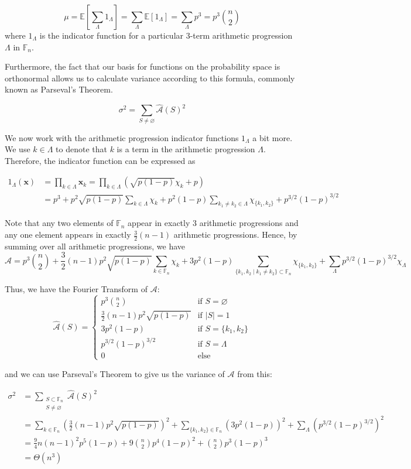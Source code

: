 \documentclass[12pt]{article} %
\newcommand{\p}[1]{\left(#1\right)}
\newcommand{\s}[1]{\left[#1\right]}
\newcommand{\abs}[1]{\left\lvert#1\right\rvert}
\newcommand{\ap}{\mathcal{A}}
\newcommand{\E}{\mathbb{E}}
\newcommand{\F}{\mathbb{F}}
\newcommand{\bfx}{\mathbf{x}}
\theoremstyle{definition}
\theoremstyle{remark}
\begin{document}
\[\mu = \E\s{\sum_{\Lambda} {1_\Lambda}} = \sum_{\Lambda} {\E[1_\Lambda]} = \sum_{\Lambda} {p^3} = p^3\binom{n}{2}\]
where $1_\Lambda$ is the indicator function for a particular 3-term arithmetic progression $\Lambda$ in $\F_n$.

Furthermore, the fact that our basis for functions on the probability space is orthonormal allows us to calculate variance according to this formula, commonly known as Parseval's Theorem.

\[\sigma^2 = \sum_{S \neq \varnothing} {\hat{\ap}(S)^2} \]

We now work with the arithmetic progression indicator functions $1_\Lambda$ a bit more. We use $k \in \Lambda$ to denote that $k$ is a term in the arithmetic progression $\Lambda$. Therefore, the indicator function can be expressed as

\begin{align*}
1_\Lambda(\bfx) &= \prod_{k \in \Lambda} {\bfx_k} = \prod_{k \in \Lambda} {\p{\sqrt{p(1-p)}\chi_k + p}} \\ 
&= p^3+p^2\sqrt{p(1-p)}\sum_{k \in \Lambda} {\chi_k} + p^2(1-p)\sum_{k_1 \neq k_2 \in \Lambda} {\chi_{\{k_1, k_2\}}} + p^{3/2}(1-p)^{3/2} 
\end{align*}

Note that any two elements of $\F_n$ appear in exactly 3 arithmetic progressions and any one element appears in exactly $\frac{3}{2}(n-1)$ arithmetic progressions. Hence, by summing over all arithmetic progressions, we have
\[\ap = p^3 {{n}\choose{2}} + \frac{3}{2}(n-1)p^2\sqrt{p(1-p)}\sum_{k \in \F_n} \chi_k + 3p^2(1-p)\sum_{\{k_1, k_2 \mid k_1 \neq k_2\} \subset \F_n} \chi_{\{k_1, k_2 \}} + \sum_{\Lambda} p^{3/2}(1-p)^{3/2}\chi_{\Lambda}\]

Thus, we have the Fourier Transform of $\ap$:
\[\hat{\ap}(S) = \begin{cases} 
      p^3 {{n}\choose{2}} & \text{if } S = \varnothing \\[10pt]
      \frac{3}{2}(n-1)p^2\sqrt{p(1-p)} & \text{if } \abs{S} = 1 \\[10pt]
      3p^2(1-p) & \text{if } S = \{k_1,k_2\} \\[10pt]
      p^{3/2}(1-p)^{3/2} & \text{if } S = \Lambda \\[10pt]
      0 & \text{else}
\end{cases} \]

and we can use Parseval's Theorem to give us the variance of $\ap$ from this:

\begin{align*}
\sigma^2 &= \sum_{\substack{S \subset \F_n \\ S \neq \varnothing}} {\hat{\ap}(S)^2} \\
&= \sum_{k \in \F_n} {\p{\frac{3}{2}(n-1)p^2\sqrt{p(1-p)}}^2} + \sum_{\{k_1, k_2\} \in \F_n} {\p{3p^2(1-p)}^2} + \sum_{\Lambda} {\p{p^{3/2}(1-p)^{3/2}}^2} \\
&= \frac{9}{4}n(n-1)^2p^5(1-p) + 9\binom{n}{2}p^4(1-p)^2 + \binom{n}{2}p^3(1-p)^3 \\
&= \Theta(n^3)
\end{align*}
\end{document}
